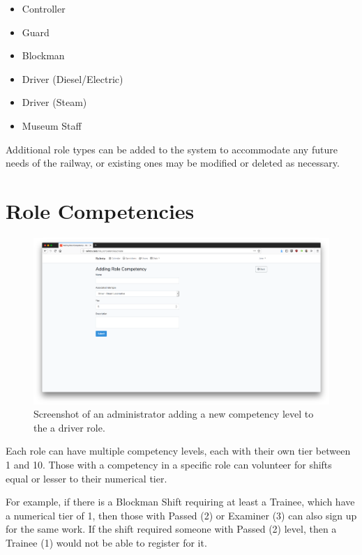 \begin{itemize}
    \item Controller
    \item Guard
    \item Blockman
    \item Driver (Diesel/Electric)
    \item Driver (Steam)
    \item Museum Staff
\end{itemize}

Additional role types can be added to the system to accommodate any future needs of the railway, or existing ones may be modified or deleted as necessary.

\section{Role Competencies}

\begin{figure}[!ht]
    \centering
    \includegraphics[width=1.0\textwidth]{Figures/screenshot-competency-create}
    \caption{Screenshot of an administrator adding a new competency level to the a driver role.}
    \label{fig:competencies-create}
\end{figure}

Each role can have multiple competency levels, each with their own tier between 1 and 10. Those with a competency in a specific role can volunteer for shifts equal or lesser to their numerical tier. 

For example, if there is a Blockman Shift requiring at least a Trainee, which have a numerical tier of 1, then those with Passed (2) or Examiner (3) can also sign up for the same work. If the shift required someone with Passed (2) level, then a Trainee (1) would not be able to register for it.

